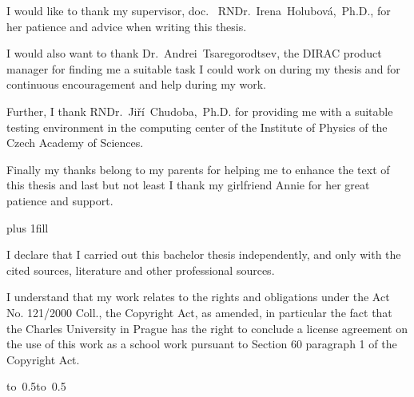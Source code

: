 \documentclass[12pt,a4paper]{report}
\let\openright=\clearpage
\begin{document}
\newpage



\openright

\noindent
I would like to thank my supervisor, doc.~ RNDr.~Irena~Holubová,~Ph.D., for her patience and advice when
writing this thesis. 

\medskip \noindent
I would also want to thank Dr.~Andrei~Tsaregorodtsev, the DIRAC product manager for finding me a suitable
task I could work on during my thesis and for continuous encouragement and help during my work. 

\medskip \noindent
Further, I thank RNDr.~Jiří~Chudoba,~Ph.D. for providing me with a suitable testing
environment in the computing center of the Institute of Physics of the Czech Academy of Sciences.

\medskip \noindent
Finally my thanks belong to my parents for helping me to enhance the text of this thesis and last but not least I 
thank my girlfriend Annie for her great patience and support.

\newpage


\vglue 0pt plus 1fill

\noindent
I declare that I carried out this bachelor thesis independently, and only with the cited
sources, literature and other professional sources.

\medskip\noindent
I understand that my work relates to the rights and obligations under the Act No.
121/2000 Coll., the Copyright Act, as amended, in particular the fact that the Charles
University in Prague has the right to conclude a license agreement on the use of this
work as a school work pursuant to Section 60 paragraph 1 of the Copyright Act.

\vspace{10mm}

\hbox{\hbox to 0.5\hbox to 0.5}

\vspace{20mm}
\newpage

\end{document}
